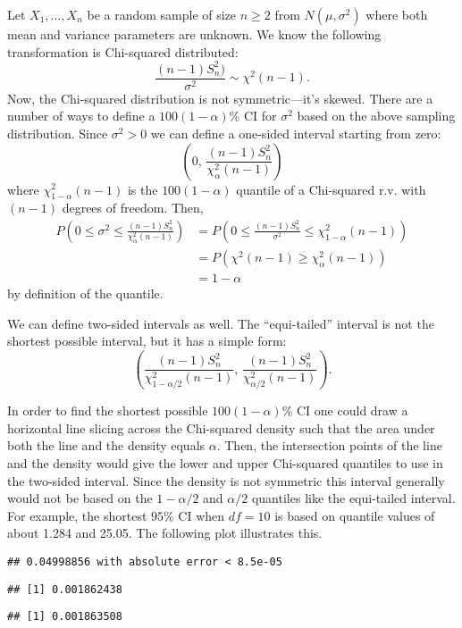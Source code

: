 \documentclass[
]{book}
\begin{document}
Let \(X_1, \ldots, X_n\) be a random sample of size \(n\geq 2\) from \(N(\mu, \sigma^2)\) where both mean and variance parameters are unknown. We know the following transformation is Chi-squared distributed:
\[\frac{(n-1)S_n^2)}{\sigma^2}\sim \chi^2(n-1).\]
Now, the Chi-squared distribution is not symmetric---it's skewed. There are a number of ways to define a \(100(1-\alpha)\%\) CI for \(\sigma^2\) based on the above sampling distribution. Since \(\sigma^2 > 0\) we can define a one-sided interval starting from zero:
\[\left(0, \, \frac{(n-1)S_n^2}{\chi^2_{\alpha}(n-1)}\right)\]
where \(\chi^2_{1-\alpha}(n-1)\) is the \(100(1-\alpha)\) quantile of a Chi-squared r.v. with \((n-1)\) degrees of freedom. Then,
\begin{align*}
P(0 \leq \sigma^2 \leq \frac{(n-1)S_n^2}{\chi^2_{\alpha}(n-1)}) &= P(0\leq \frac{(n-1)S_n^2}{\sigma^2} \leq \chi^2_{1-\alpha}(n-1))\\
& = P(\chi^2(n-1) \geq \chi^2_{\alpha}(n-1))\\
&= 1-\alpha
\end{align*}
by definition of the quantile.

We can define two-sided intervals as well. The ``equi-tailed'' interval is not the shortest possible interval, but it has a simple form:
\[\left(\frac{(n-1)S_n^2}{\chi^2_{1-\alpha/2}(n-1)}, \, \frac{(n-1)S_n^2}{\chi^2_{\alpha/2}(n-1)}\right).\]

In order to find the shortest possible \(100(1-\alpha)\%\) CI one could draw a horizontal line slicing across the Chi-squared density such that the area under both the line and the density equals \(\alpha\). Then, the intersection points of the line and the density would give the lower and upper Chi-squared quantiles to use in the two-sided interval. Since the density is not symmetric this interval generally would not be based on the \(1-\alpha/2\) and \(\alpha/2\) quantiles like the equi-tailed interval. For example, the shortest \(95\%\) CI when \(df=10\) is based on quantile values of about 1.284 and 25.05. The following plot illustrates this.

\begin{verbatim}
## 0.04998856 with absolute error < 8.5e-05
\end{verbatim}

\begin{verbatim}
## [1] 0.001862438
\end{verbatim}

\begin{verbatim}
## [1] 0.001863508
\end{verbatim}
\end{document}
